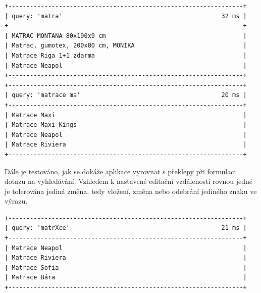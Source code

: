 \documentclass[FM,DP]{tulthesis}
\newenvironment{code}
    {\filbreak\captionsetup{type=listing}}{\filbreak}
\begin{document}
\begin{code}
\captionsetup{singlelinecheck=false,justification=raggedright}
\label{code:search-suggest}
\begin{verbatim}
+-----------------------------------------------------------------+
| query: 'matra'                                            32 ms |
+-----------------------------------------------------------------+
| MATRAC MONTANA 80x190x9 cm                                      |
| Matrac, gumotex, 200x80 cm, MONIKA                              |
| Matrace Riga 1+1 zdarma                                         |
| Matrace Neapol                                                  |
+-----------------------------------------------------------------+
+-----------------------------------------------------------------+
| query: 'matrace ma'                                       20 ms |
+-----------------------------------------------------------------+
| Matrace Maxi                                                    |
| Matrace Maxi Kings                                              |
| Matrace Neapol                                                  |
| Matrace Riviera                                                 |
+-----------------------------------------------------------------+
\end{verbatim}
\end{code}

Dále je testováno, jak se dokáže aplikace vyrovnat s překlepy při formulaci dotazu na vyhledávání.
Vzhledem k nastavené editační vzdálenosti rovnou jedné je tolerována jediná změna, tedy vložení, změna
nebo odebrání jediného znaku ve výrazu. 

\begin{code}
\captionsetup{singlelinecheck=false,justification=raggedright}
\label{code:search-fuzzy}
\begin{verbatim}
+-----------------------------------------------------------------+
| query: 'matrXce'                                          21 ms |
+-----------------------------------------------------------------+
| Matrace Neapol                                                  |
| Matrace Riviera                                                 |
| Matrace Sofia                                                   |
| Matrace Bára                                                    |
+-----------------------------------------------------------------+
\end{verbatim}
\end{code}
\end{document}
